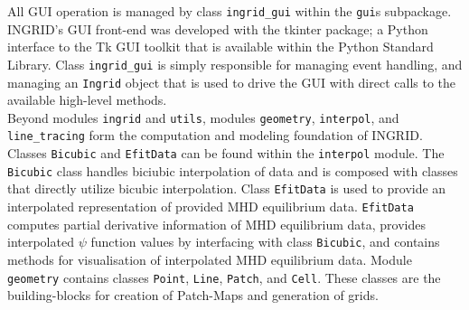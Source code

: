 All GUI operation is managed by class \texttt{ingrid\_gui} within the \texttt{gui}s subpackage. INGRID's GUI front-end was developed with the tkinter package; a Python interface to the Tk GUI toolkit that is available within the Python Standard Library. Class \texttt{ingrid\_gui} is simply responsible for managing event handling, and managing an \texttt{Ingrid} object that is used to drive the GUI with direct calls to the available high-level methods.\\ \indent
Beyond modules \texttt{ingrid} and \texttt{utils}, modules \texttt{geometry}, \texttt{interpol}, and \texttt{line\_tracing} form the computation and modeling foundation of INGRID. Classes \texttt{Bicubic} and \texttt{EfitData} can be found within the \texttt{interpol} module. The \texttt{Bicubic} class handles biciubic interpolation of data and is composed with classes that directly utilize bicubic interpolation. Class \texttt{EfitData} is used to provide an interpolated representation of provided MHD equilibrium data. \texttt{EfitData} computes partial derivative information of MHD equilibrium data, provides interpolated $\psi$ function values by interfacing with class \texttt{Bicubic}, and contains methods for visualisation of interpolated MHD equilibrium data. Module \texttt{geometry} contains classes \texttt{Point}, \texttt{Line}, \texttt{Patch}, and \texttt{Cell}. These classes are the building-blocks for creation of Patch-Maps and generation of grids.